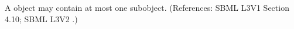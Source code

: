 A \Constraint object may contain at most one \Message subobject.
(References: SBML L3V1 Section 4.10; SBML L3V2 .)
